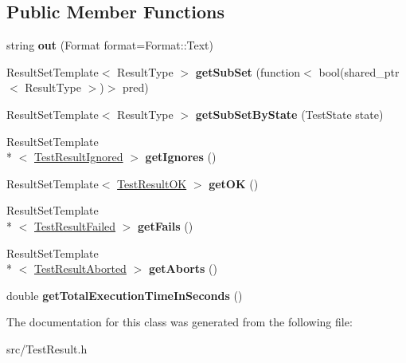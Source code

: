 \subsection*{Public Member Functions}
\begin{DoxyCompactItemize}
\item 
\hypertarget{class_result_set_mixin_aaca24c1c9e8220cf44e27db1640cf1b4}{string {\bfseries out} (Format format=Format\-::\-Text)}\label{class_result_set_mixin_aaca24c1c9e8220cf44e27db1640cf1b4}

\item 
\hypertarget{class_result_set_mixin_aafb94ef2b16309909738d18291f1c018}{Result\-Set\-Template$<$ Result\-Type $>$ {\bfseries get\-Sub\-Set} (function$<$ bool(shared\-\_\-ptr$<$ Result\-Type $>$)$>$ pred)}\label{class_result_set_mixin_aafb94ef2b16309909738d18291f1c018}

\item 
\hypertarget{class_result_set_mixin_a9dd29a1c027bb82370e38ae67edf2aa8}{Result\-Set\-Template$<$ Result\-Type $>$ {\bfseries get\-Sub\-Set\-By\-State} (Test\-State state)}\label{class_result_set_mixin_a9dd29a1c027bb82370e38ae67edf2aa8}

\item 
\hypertarget{class_result_set_mixin_a1d6355d01e32a56a784876b5d5a8ef41}{Result\-Set\-Template\\*
$<$ \hyperlink{class_test_result_ignored}{Test\-Result\-Ignored} $>$ {\bfseries get\-Ignores} ()}\label{class_result_set_mixin_a1d6355d01e32a56a784876b5d5a8ef41}

\item 
\hypertarget{class_result_set_mixin_a05c1b2750f9ccc0b34194bec7d9c7f05}{Result\-Set\-Template$<$ \hyperlink{class_test_result_o_k}{Test\-Result\-O\-K} $>$ {\bfseries get\-O\-K} ()}\label{class_result_set_mixin_a05c1b2750f9ccc0b34194bec7d9c7f05}

\item 
\hypertarget{class_result_set_mixin_a804dba36175ab4c579dba8d405f60557}{Result\-Set\-Template\\*
$<$ \hyperlink{class_test_result_failed}{Test\-Result\-Failed} $>$ {\bfseries get\-Fails} ()}\label{class_result_set_mixin_a804dba36175ab4c579dba8d405f60557}

\item 
\hypertarget{class_result_set_mixin_a19bae2efe44b46e22a1cc53c9c2192da}{Result\-Set\-Template\\*
$<$ \hyperlink{class_test_result_aborted}{Test\-Result\-Aborted} $>$ {\bfseries get\-Aborts} ()}\label{class_result_set_mixin_a19bae2efe44b46e22a1cc53c9c2192da}

\item 
\hypertarget{class_result_set_mixin_aa512f0b446e510f16433295d3c6e27dd}{double {\bfseries get\-Total\-Execution\-Time\-In\-Seconds} ()}\label{class_result_set_mixin_aa512f0b446e510f16433295d3c6e27dd}

\end{DoxyCompactItemize}


The documentation for this class was generated from the following file\-:\begin{DoxyCompactItemize}
\item 
src/Test\-Result.\-h\end{DoxyCompactItemize}
